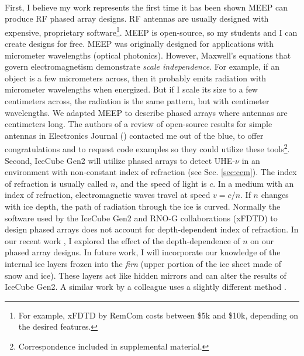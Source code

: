 \documentclass[../../../main.tex]{subfiles}
\begin{document}
\\
\vspace{0.25cm}
First, I believe my work represents the first time it has been shown MEEP can produce RF phased array designs.  RF antennas are usually designed with expensive, proprietary software\footnote{For example, xFDTD by RemCom costs between \$5k and \$10k, depending on the desired features.}.  MEEP is open-source, so my students and I can create designs for free.  MEEP was originally designed for applications with micrometer wavelengths (optical photonics).  However, Maxwell's equations that govern electromagnetism demonstrate \textit{scale independence}.  For example, if an object is a few micrometers across, then it probably emits radiation with micrometer wavelengths when energized.  But if I scale its size to a few centimeters across, the radiation is the same pattern, but with centimeter wavelengths.  We adapted MEEP to describe phased arrays where antennas are centimeters long.  The authors of a review of open-source results for simple antennas in Electronics Journal (\cite{10.3390/electronics8121506}) contacted me out of the blue, to offer congratulations and to request code examples so they could utilize these tools\footnote{Correspondence included in supplemental material.}.
\\
\vspace{0.25cm}
Second, IceCube Gen2 will utilize phased arrays to detect UHE-$\nu$ in an environment with non-constant index of refraction (see Sec. \ref{sec:cem}).  The index of refraction is usually called $n$, and the speed of light is $c$.  In a medium with an index of refraction, electromagnetic waves travel at speed $v = c/n$.  If $n$ changes with ice depth, the path of radiation through the ice is curved.  Normally the software used by the IceCube Gen2 and RNO-G collaborations (xFDTD) to design phased arrays does not account for depth-dependent index of refraction. In our recent work \cite{electronics10040415}, I explored the effect of the depth-dependence of $n$ on our phased array designs.  In future work, I will incorporate our knowledge of the internal ice layers frozen into the \textit{firn} (upper portion of the ice sheet made of snow and ice).  These layers act like hidden mirrors and can alter the results of IceCube Gen2.  A similar work by a colleague uses a slightly different method \cite{prohira}.
\\
\vspace{0.25cm}
\end{document}
